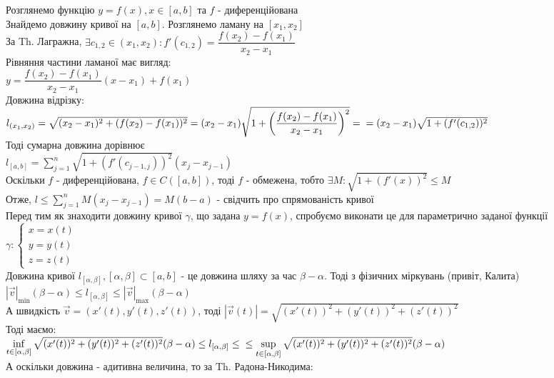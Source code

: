 \documentclass[a4paper, 14pt]{extarticle}
\def\huge{\displaystyle}
\def\bigline{\vspace{5mm}\\}
\theoremstyle{theoremdd}
\theoremstyle{theoremdd}
\theoremstyle{theoremdd}
\theoremstyle{theoremdd}
\theoremstyle{theoremdd}
\theoremstyle{theoremdd}
\theoremstyle{theoremdd}
\theoremstyle{theoremdd}
\begin{document}
Розглянемо функцію $y = f(x), x \in [a,b]$ та $f$ - диференційована\\
Знайдемо довжину кривої на $[a,b]$. Розглянемо ламану на $[x_1,x_2]$\\
За Th. Лагражна, $\exists c_{1,2} \in (x_1,x_2): f'(c_{1,2}) = \dfrac{f(x_2) - f(x_1)}{x_2-x_1}$\\
Рівняння частини ламаної має вигляд:\\
$y = \dfrac{f(x_2)-f(x_1)}{x_2-x_1}(x-x_1) + f(x_1)$\\
Довжина відрізку:\\
$l_{(x_1,x_2)} = \sqrt{(x_2-x_1)^2 + (f(x_2)-f(x_1))^2} = (x_2-x_1) \sqrt{1 + \left( \dfrac{f(x_2)-f(x_1)}{x_2-x_1} \right)^2} = \\ = (x_2-x_1) \sqrt{1+(f'(c_{1,2}))^2}$\\
Тоді сумарна довжина дорівнює\\
$l_{[a,b]} = \huge \sum_{j=1}^n \sqrt{1 + (f'(c_{j-1,j}))^2} (x_j-x_{j-1})$\\
Оскільки $f$ - диференційована, $f \in C([a,b])$, тоді $f$ - обмежена, тобто $\exists M: \sqrt{1+ (f'(x))^2} \leq M$\\
Отже, $l \leq \huge \sum_{j=1}^n M(x_j-x_{j-1}) = M(b-a)$ - свідчить про спрямованість кривої
\bigline
Перед тим як знаходити довжину кривої $\gamma$, що задана $y = f(x)$, спробуємо виконати це для параметрично заданої функції\\
$\gamma: \begin{cases}
 x = x(t) \\ y = y(t) \\ z = z(t)
 \end{cases}$\\
Довжина кривої $l_{[\alpha,\beta]}, [\alpha,\beta] \subset [a,b]$ - це довжина шляху за час $\beta - \alpha$. Тоді з фізичних міркувань (привіт, Калита)\\
$|\vec{v}|_{\min} (\beta - \alpha) \leq l_{[\alpha, \beta]} \leq |\vec{v}|_{\max} (\beta - \alpha)$\\
А швидкість $\vec{v} = (x'(t),y'(t),z'(t))$, тоді $|\vec{v}(t)| = \sqrt{(x'(t))^2+(y'(t))^2+(z'(t))^2}$\\
Тоді маємо:\\
$\huge \inf_{t \in [\alpha,\beta]} \sqrt{(x'(t))^2+(y'(t))^2+(z'(t))^2} (\beta - \alpha) \leq l_{[\alpha,\beta]} \leq \\ \leq \sup_{t \in [\alpha,\beta]} \sqrt{(x'(t))^2+(y'(t))^2+(z'(t))^2} (\beta - \alpha)$\\
А оскільки довжина - адитивна величина, то за Th. Радона-Никодима:\\
\end{document}
